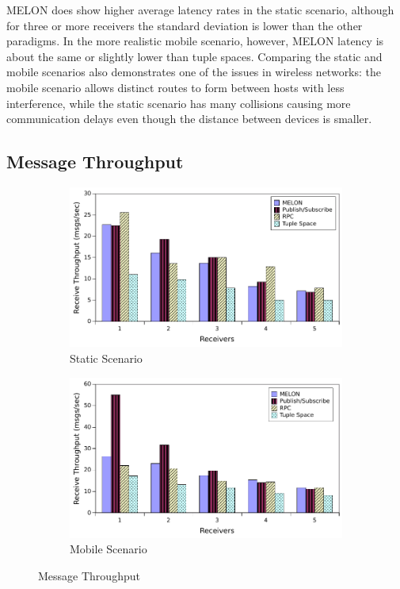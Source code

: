 \documentclass[lnicst]{svmultln}
\begin{document}
MELON does show higher average latency rates in the static scenario, although for three or more receivers the standard deviation is lower than the other paradigms. In the more realistic mobile scenario, however, MELON latency is about the same or slightly lower than tuple spaces. Comparing the static and mobile scenarios also demonstrates one of the issues in wireless networks: the mobile scenario allows distinct routes to form between hosts with less interference, while the static scenario has many collisions causing more communication delays even though the distance between devices is smaller.

\subsection{Message Throughput}

\begin{figure}
\centering

\begin{subfigure}{.5\textwidth}
\centering
\includegraphics[width = \linewidth, clip, trim = 0px 0px 0px 0px]{figures/throughput_static.pdf}
\caption{Static Scenario}
\label{fig:throughputstatic}
\end{subfigure}%
\begin{subfigure}{.5\textwidth}
\centering
\includegraphics[width = \linewidth, clip, trim = 0px 0px 0px 0px]{figures/throughput_mobile.pdf}
\caption{Mobile Scenario}
\label{fig:throughputmobile}
\end{subfigure}
\caption{Message Throughput}
\end{figure}
\end{document}
